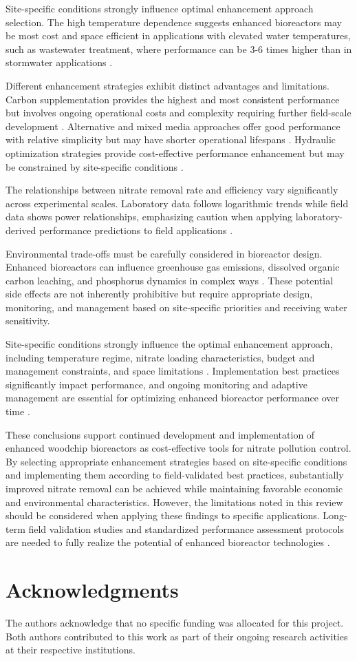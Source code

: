 \documentclass[12pt,a4paper]{article}
\begin{document}
Site-specific conditions strongly influence optimal enhancement approach selection. The high temperature dependence suggests enhanced bioreactors may be most cost and space efficient in applications with elevated water temperatures, such as wastewater treatment, where performance can be 3-6 times higher than in stormwater applications \citep{RN258, RN315}.

Different enhancement strategies exhibit distinct advantages and limitations. Carbon supplementation provides the highest and most consistent performance but involves ongoing operational costs and complexity requiring further field-scale development \citep{RN632, RN196}. Alternative and mixed media approaches offer good performance with relative simplicity but may have shorter operational lifespans \citep{RN350, RN624}. Hydraulic optimization strategies provide cost-effective performance enhancement but may be constrained by site-specific conditions \citep{RN309}.

The relationships between nitrate removal rate and efficiency vary significantly across experimental scales. Laboratory data follows logarithmic trends while field data shows power relationships, emphasizing caution when applying laboratory-derived performance predictions to field applications \citep{RN312}.

Environmental trade-offs must be carefully considered in bioreactor design. Enhanced bioreactors can influence greenhouse gas emissions, dissolved organic carbon leaching, and phosphorus dynamics in complex ways \citep{RN1181, RN291, RN370}. These potential side effects are not inherently prohibitive but require appropriate design, monitoring, and management based on site-specific priorities and receiving water sensitivity.

Site-specific conditions strongly influence the optimal enhancement approach, including temperature regime, nitrate loading characteristics, budget and management constraints, and space limitations \citep{RN310}. Implementation best practices significantly impact performance, and ongoing monitoring and adaptive management are essential for optimizing enhanced bioreactor performance over time \citep{RN310, RN312}.

These conclusions support continued development and implementation of enhanced woodchip bioreactors as cost-effective tools for nitrate pollution control. By selecting appropriate enhancement strategies based on site-specific conditions and implementing them according to field-validated best practices, substantially improved nitrate removal can be achieved while maintaining favorable economic and environmental characteristics. However, the limitations noted in this review should be considered when applying these findings to specific applications. Long-term field validation studies and standardized performance assessment protocols are needed to fully realize the potential of enhanced bioreactor technologies \citep{RN625, RN310}.

\section{Acknowledgments}

The authors acknowledge that no specific funding was allocated for this project. Both authors contributed to this work as part of their ongoing research activities at their respective institutions.



\end{document}
